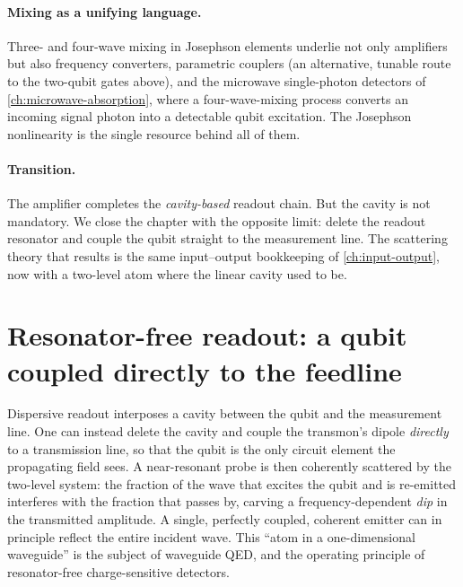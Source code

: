 \paragraph{Mixing as a unifying language.}
Three- and four-wave mixing in Josephson elements underlie not only
amplifiers but also frequency converters, parametric couplers (an
alternative, tunable route to the two-qubit gates above), and the
microwave single-photon detectors of \cref{ch:microwave-absorption},
where a four-wave-mixing process converts an incoming signal photon
into a detectable qubit excitation. The Josephson nonlinearity is the
single resource behind all of them.

\paragraph{Transition.}
The amplifier completes the \emph{cavity-based} readout chain. But the
cavity is not mandatory. We close the chapter with the opposite limit:
delete the readout resonator and couple the qubit straight to the
measurement line. The scattering theory that results is the same
input--output bookkeeping of \cref{ch:input-output}, now with a
two-level atom where the linear cavity used to be.

\section{Resonator-free readout: a qubit coupled directly to the feedline}
\label{sec:waveguide-readout}

\begin{phenomenon}
Dispersive readout interposes a cavity between the qubit and the
measurement line. One can instead delete the cavity and couple the
transmon's dipole \emph{directly} to a transmission line, so that the
qubit is the only circuit element the propagating field sees. A
near-resonant probe is then coherently scattered by the two-level
system: the fraction of the wave that excites the qubit and is
re-emitted interferes with the fraction that passes by, carving a
frequency-dependent \emph{dip} in the transmitted amplitude. A single,
perfectly coupled, coherent emitter can in principle reflect the entire
incident wave. This ``atom in a one-dimensional waveguide'' is the
subject of waveguide QED, and the operating principle of
resonator-free charge-sensitive detectors.
\end{phenomenon}

